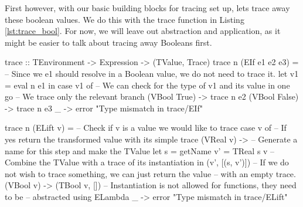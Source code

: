         First however, with our basic building blocks for tracing set up, lets trace away these boolean values.
        We do this with the trace function in Listing \ref{lst:trace_bool}.
        For now, we will leave out abstraction and application, as it might be easier to talk about tracing away Booleans first.

        \begin{haskell}[caption=Tracing away Boolean values, label=lst:trace_bool, gobble=12]
            trace :: TEnvironment -> Expression -> (TValue, Trace)
            trace n (EIf e1 e2 e3) =
                -- Since we e1 should resolve in a Boolean value, we do not need to trace it.
                let v1 = eval n e1
                in  case v1 of
                    -- We can check for the type of v1 and its value in one go
                    -- We trace only the relevant branch
                    (VBool True)  -> trace n e2
                    (VBool False) -> trace n e3
                    _             -> error "Type mismatch in trace/EIf"
            
            trace n (ELift v) =
                -- Check if v is a value we would like to trace
                case v of
                    -- If yes return the transformed value with its simple trace
                    (VReal v) ->
                        -- Generate a name for this step and make the TValue
                        let s  = getName
                            v' = TReal s v
                        -- Combine the TValue with a trace of its instantiation
                        in  (v', [(s, v')])
                    -- If we do not wish to trace something, we can just return the value 
                    -- with an empty trace.
                    (VBool v) -> (TBool v, [])
                    -- Instantiation is not allowed for functions, they need to be 
                    -- abstracted using ELambda
                    _         -> error "Type mismatch in trace/ELift"


\end{haskell}
